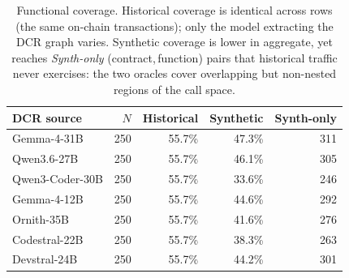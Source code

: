 \begin{table}[t]\centering\small
\caption{Functional coverage. Historical coverage is identical across rows (the same on-chain transactions); only the model extracting the DCR graph varies. Synthetic coverage is lower in aggregate, yet reaches \emph{Synth-only} (contract,\,function) pairs that historical traffic never exercises: the two oracles cover overlapping but non-nested regions of the call space.}
\label{tab:coverage}
\begin{tabular}{l r r r r}
\toprule
DCR source & $N$ & Historical & Synthetic & Synth-only \\
\midrule
Gemma-4-31B & 250 & 55.7\% & 47.3\% & 311 \\
Qwen3.6-27B & 250 & 55.7\% & 46.1\% & 305 \\
Qwen3-Coder-30B & 250 & 55.7\% & 33.6\% & 246 \\
Gemma-4-12B & 250 & 55.7\% & 44.6\% & 292 \\
Ornith-35B & 250 & 55.7\% & 41.6\% & 276 \\
Codestral-22B & 250 & 55.7\% & 38.3\% & 263 \\
Devstral-24B & 250 & 55.7\% & 44.2\% & 301 \\
\bottomrule\end{tabular}\end{table}

